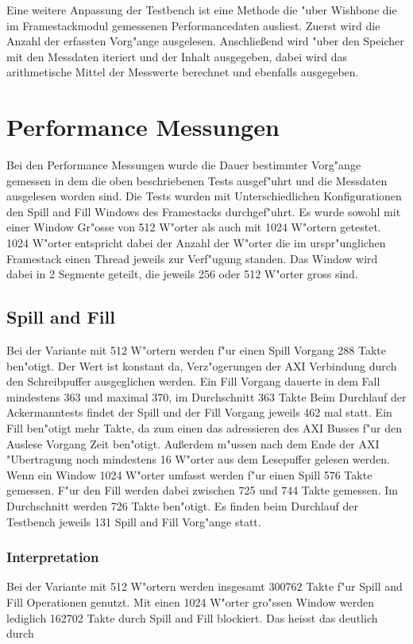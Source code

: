 Eine weitere Anpassung der Testbench ist eine Methode die "uber Wishbone die im Framestackmodul gemessenen Performancedaten ausliest.  Zuerst wird die Anzahl der erfassten Vorg"ange ausgelesen. Anschließend wird "uber den Speicher mit den Messdaten iteriert und der Inhalt ausgegeben, dabei wird das arithmetische Mittel der Messwerte berechnet und ebenfalls ausgegeben. 


\section{Performance Messungen}
Bei den Performance Messungen wurde die Dauer bestimmter Vorg"ange gemessen in dem die oben beschriebenen Tests ausgef"uhrt und die Messdaten ausgelesen worden sind. 
Die Tests wurden mit Unterschiedlichen Konfigurationen den Spill and Fill Windows des Framestacks durchgef"uhrt. Es wurde sowohl mit einer Window Gr"o{ss}e von 512 W"orter als auch mit 1024 W"ortern getestet. 1024 W"orter entspricht dabei der Anzahl der W"orter die im urspr"unglichen Framestack einen Thread jeweils zur Verf"ugung standen. Das Window wird dabei in 2 Segmente geteilt, die jeweils 256 oder 512 W"orter gro{ss} sind.

\subsection{Spill and Fill}

Bei der Variante mit 512 W"ortern werden f"ur einen Spill Vorgang 288 Takte ben"otigt. Der Wert ist konstant da, Verz"ogerungen der AXI Verbindung durch den Schreibpuffer ausgeglichen werden. Ein Fill Vorgang dauerte in dem Fall mindestens 363 und maximal 370, im Durchschnitt 363 Takte 
Beim Durchlauf der Ackermanntests findet der Spill und der Fill Vorgang jeweils 462 mal statt. 
Ein Fill ben"otigt mehr Takte, da zum einen das adressieren des AXI Busses f"ur den Auslese Vorgang Zeit ben"otigt. Außerdem m"ussen nach dem Ende der AXI "Ubertragung noch mindestens 16 W"orter aus dem Lesepuffer gelesen werden.  
Wenn ein Window 1024 W"orter umfasst werden f"ur einen Spill 576 Takte gemessen. F"ur den Fill werden dabei zwischen 725 und 744 Takte gemessen. Im Durchschnitt werden 726 Takte ben"otigt. 
Es finden beim Durchlauf der Testbench jeweils 131 Spill and Fill Vorg"ange statt. 
\subsubsection{Interpretation}
Bei der Variante mit 512 W"ortern werden insgesamt 300762 Takte f"ur Spill and Fill Operationen genutzt. Mit einen 1024 W"orter gro"{ss}en Window werden lediglich 162702 Takte durch Spill and Fill blockiert. Das hei{ss}t das deutlich durch 


